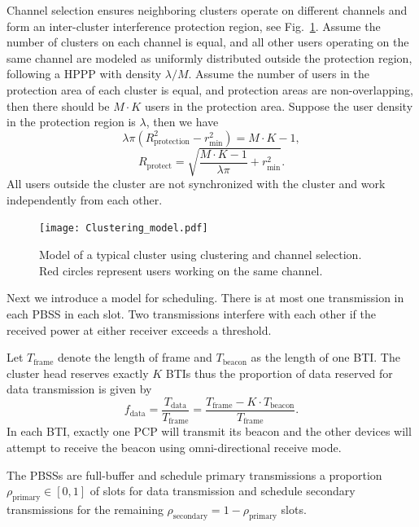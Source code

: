 \documentclass[10pt, conference, letterpaper]{IEEEtran}
\begin{document}
Channel selection ensures neighboring clusters operate on different channels and form an inter-cluster interference protection region, see Fig.~\ref{fig:clusteranalysis:model}.
Assume the number of clusters on each channel is equal, and all other users operating on the same channel are modeled as uniformly distributed outside the protection region, following a HPPP with density $\lambda/M$.
Assume the number of users in the protection area of each cluster is equal, and protection areas are non-overlapping, then there should be $M\cdot K$ users in the protection area. 
Suppose the user density in the protection region is $\lambda$, then we have 
\begin{equation*}
\lambda \pi (R_{\mathrm{protection}}^2 - r_{\min}^2) = M\cdot K - 1,
\end{equation*}
\begin{equation*}
R_{\mathrm{protect}} = \sqrt{\frac{M\cdot K - 1}{\lambda \pi} + r_{\min}^2}.
\end{equation*}
All users outside the cluster are not synchronized with the cluster and work independently from each other.  

\begin{figure}
	\centering
	\texttt{[image: Clustering\_model.pdf]}
	\caption{Model of a typical cluster using clustering and channel selection. Red circles represent users working on the same channel.}
	\label{fig:clusteranalysis:model}
\end{figure}


Next we introduce a model for scheduling.
There is at most one transmission in each PBSS in each slot. 
Two transmissions interfere with each other if the received power at either receiver exceeds a threshold.

Let $T_{\mathrm{frame}}$ denote the length of frame and $T_{\mathrm{beacon}}$ as the length of one BTI. 
The cluster head reserves exactly $K$ BTIs thus the proportion of data reserved for data transmission is given by
\begin{equation*}
f_{\mathrm{data}} = \frac{T_{\mathrm{data}}}{T_{\mathrm{frame}}} = \frac{T_{\mathrm{frame}} - K\cdot T_{\mathrm{beacon}}} {T_{\mathrm{frame}}}.
\end{equation*}
In each BTI, exactly one PCP will transmit its beacon and the other devices will attempt to receive the beacon using omni-directional receive mode. 

The PBSSs are full-buffer and schedule primary transmissions a proportion $\rho_{\mathrm{primary}}\in[0,1]$ of slots for data transmission and schedule secondary transmissions for the remaining $\rho_{\mathrm{secondary}} =1 - \rho_{\mathrm{primary}}$  slots. 
\end{document}
